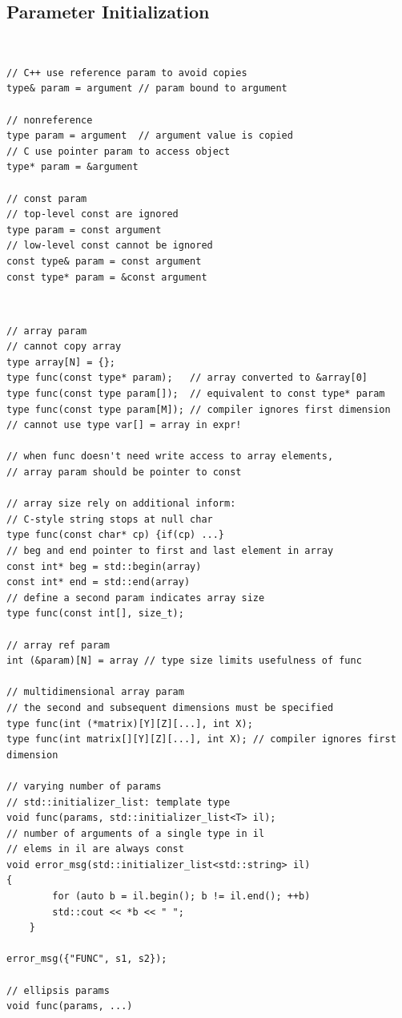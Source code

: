 \documentclass{blog}
\begin{document}
\subsection{Parameter Initialization}
\begin{definition}~
    \begin{verbatim}
// C++ use reference param to avoid copies
type& param = argument // param bound to argument

// nonreference
type param = argument  // argument value is copied
// C use pointer param to access object
type* param = &argument

// const param
// top-level const are ignored
type param = const argument
// low-level const cannot be ignored
const type& param = const argument
const type* param = &const argument
\end{verbatim}
\end{definition}

\begin{definition}~
    \begin{verbatim}
// array param
// cannot copy array
type array[N] = {};
type func(const type* param);   // array converted to &array[0]
type func(const type param[]);  // equivalent to const type* param
type func(const type param[M]); // compiler ignores first dimension
// cannot use type var[] = array in expr!

// when func doesn't need write access to array elements,
// array param should be pointer to const

// array size rely on additional inform:
// C-style string stops at null char
type func(const char* cp) {if(cp) ...}
// beg and end pointer to first and last element in array
const int* beg = std::begin(array)
const int* end = std::end(array)
// define a second param indicates array size
type func(const int[], size_t);

// array ref param
int (&param)[N] = array // type size limits usefulness of func

// multidimensional array param
// the second and subsequent dimensions must be specified
type func(int (*matrix)[Y][Z][...], int X);
type func(int matrix[][Y][Z][...], int X); // compiler ignores first dimension

// varying number of params
// std::initializer_list: template type
void func(params, std::initializer_list<T> il);
// number of arguments of a single type in il
// elems in il are always const
void error_msg(std::initializer_list<std::string> il)
{
        for (auto b = il.begin(); b != il.end(); ++b)
        std::cout << *b << " ";
    }

error_msg({"FUNC", s1, s2});

// ellipsis params
void func(params, ...)
\end{verbatim}
\end{definition}
\end{document}
